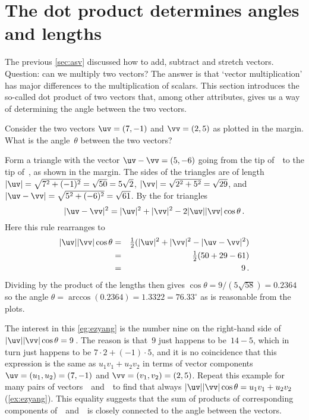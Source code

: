 
\section{The dot product determines angles and lengths}
\label{sec:dpdal}
\secttoc

The previous \autoref{sec:asv} discussed how to add, subtract and stretch vectors.
Question: can we multiply two vectors?
The answer is that `vector multiplication' has major differences to the multiplication of scalars.
This section introduces the so-called dot product of two vectors that, among other attributes, gives us a way of determining the angle between the two vectors.

\begin{example} \label{eg:ezyang}
Consider the two vectors \(\uv=(7,-1)\) and \(\vv=(2,5)\) as plotted in the margin.
\def\vecopsHook{\node[above] at (axis cs:0,0) {$\qquad\theta$};}
What is the angle~\(\theta\) between the two vectors?
\begin{solution} 
Form a triangle with the vector \(\uv-\vv=(5,-6)\) going from the tip of~\vv\ to the tip of~\uv, as shown in the margin.
%
The sides of the triangles are of length \(|\uv|=\sqrt{7^2+(-1)^2}=\sqrt{50}=5\sqrt2\), \(|\vv|=\sqrt{2^2+5^2}=\sqrt{29}\), and \(|\uv-\vv|=\sqrt{5^2+(-6)^2}=\sqrt{61}\).
By the  for triangles
\begin{equation*}
|\uv-\vv|^2=|\uv|^2+|\vv|^2-2|\uv||\vv|\cos\theta \,.
\end{equation*}
Here this rule rearranges to
\begin{eqnarray*}
|\uv||\vv|\cos\theta
&=&\tfrac12(|\uv|^2+|\vv|^2-|\uv-\vv|^2)
\\&=&\tfrac12(50+29-61)
\\&=&9\,.
\end{eqnarray*}
Dividing by the product of the lengths then gives \(\cos\theta=9/(5\sqrt{58})=0.2364\) so the angle \(\theta =\arccos(0.2364) =1.3322 =76.33^\circ\) as is reasonable from the plots.
\end{solution}
\end{example}

The interest in this \autoref{eg:ezyang} is the number nine on the right-hand side of \(|\uv||\vv|\cos\theta=9\)\,.  
The reason is that~\(9\) just happens to be~\(14-5\), which in turn just happens to be \(7\cdot2+(-1)\cdot5\), and it is no coincidence that this expression is the same as \(u_1v_1+u_2v_2\) in terms of vector components \(\uv=(u_1,u_2)=(7,-1)\) and \(\vv=(v_1,v_2)=(2,5)\).
Repeat this example for many pairs of vectors~\uv\ and~\vv\ to find that always \(|\uv||\vv|\cos\theta=u_1v_1+u_2v_2\) (\autoref{ex:ezyang}).
This equality suggests that the sum of products of corresponding components of~\uv\ and~\vv\ is closely connected to the angle between the vectors.


